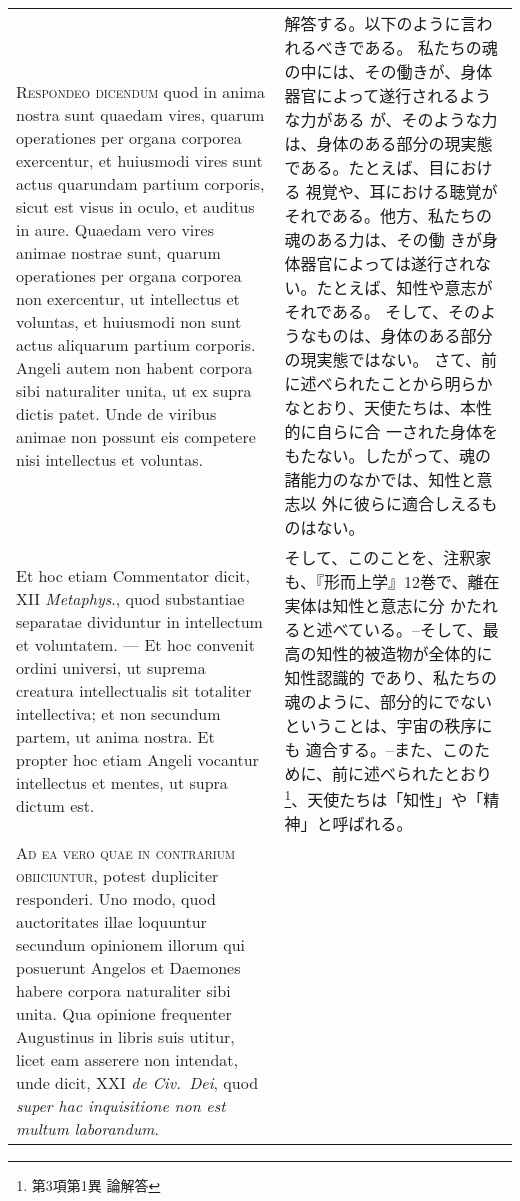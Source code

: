 \documentclass[10pt]{jsarticle} %
\begin{document}
\begin{longtable}{p{21em}p{21em}}
{\scshape Respondeo dicendum} quod in anima nostra sunt
quaedam vires, quarum operationes per organa corporea exercentur, et
huiusmodi vires sunt actus quarundam partium corporis, sicut est visus
in oculo, et auditus in aure. Quaedam vero vires animae nostrae sunt,
quarum operationes per organa corporea non exercentur, ut intellectus et
voluntas, et huiusmodi non sunt actus aliquarum partium corporis. Angeli
autem non habent corpora sibi naturaliter unita, ut ex supra dictis
patet. Unde de viribus animae non possunt eis competere nisi intellectus
et voluntas. 



&

解答する。以下のように言われるべきである。
私たちの魂の中には、その働きが、身体器官によって遂行されるような力がある
 が、そのような力は、身体のある部分の現実態である。たとえば、目における
 視覚や、耳における聴覚がそれである。他方、私たちの魂のある力は、その働
 きが身体器官によっては遂行されない。たとえば、知性や意志がそれである。
そして、そのようなものは、身体のある部分の現実態ではない。
さて、前に述べられたことから明らかなとおり、天使たちは、本性的に自らに合
 一された身体をもたない。したがって、魂の諸能力のなかでは、知性と意志以
 外に彼らに適合しえるものはない。


\\


Et hoc etiam Commentator dicit, XII {\itshape Metaphys}., quod
substantiae separatae dividuntur in intellectum et voluntatem. --- Et hoc
convenit ordini universi, ut suprema creatura intellectualis sit
totaliter intellectiva; et non secundum partem, ut anima nostra. Et
propter hoc etiam Angeli vocantur intellectus et mentes, ut supra dictum
est.

&

そして、このことを、注釈家も、『形而上学』12巻で、離在実体は知性と意志に分
 かたれると述べている。--そして、最高の知性的被造物が全体的に知性認識的
 であり、私たちの魂のように、部分的にでないということは、宇宙の秩序にも
 適合する。--また、このために、前に述べられたとおり\footnote{第3項第1異
 論解答}、天使たちは「知性」や「精神」と呼ばれる。

\\

{\scshape Ad ea vero quae in contrarium obiiciuntur},
potest dupliciter responderi. Uno modo, quod auctoritates illae
loquuntur secundum opinionem illorum qui posuerunt Angelos et Daemones
habere corpora naturaliter sibi unita. Qua opinione frequenter
Augustinus in libris suis utitur, licet eam asserere non intendat, unde
dicit, XXI {\itshape de Civ.~Dei}, quod {\itshape super hac inquisitione
 non est multum laborandum}. 


\end{longtable}
\end{document}
